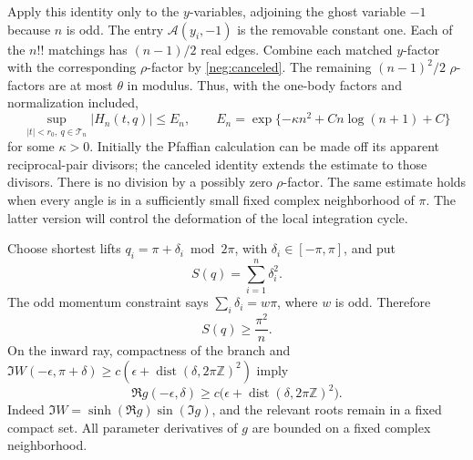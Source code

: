\documentclass[11pt]{article}
\numberwithin{equation}{section}
\theoremstyle{definition}
\newcommand{\Z}{\mathbb Z}
\begin{document}
Apply this identity only to the \(y\)-variables, adjoining the
ghost variable \(-1\) because \(n\) is odd.  The entry
\(\mathcal A(y_i,-1)\) is the removable constant one.
Each of the \(n!!\) matchings has \((n-1)/2\) real edges.
Combine each matched \(y\)-factor with the corresponding
\(\rho\)-factor by \eqref{neg:canceled}.  The remaining
\((n-1)^2/2\) \(\rho\)-factors are at most \(\theta\) in modulus.
Thus, with the one-body factors and normalization included,
\begin{equation}
 \sup_{|t|<r_0,\ q\in\mathcal T_n}|H_n(t,q)|
 \le E_n,\qquad
 E_n=\exp\{-\kappa n^2+C n\log(n+1)+C\}
 \label{neg:gaussian}
\end{equation}
for some \(\kappa>0\).  Initially the Pfaffian calculation can be
made off its apparent reciprocal-pair divisors; the canceled
identity extends the estimate to those divisors.  There is no
division by a possibly zero \(\rho\)-factor.  The same estimate
holds when every angle is in a sufficiently small fixed complex
neighborhood of \(\pi\).  The latter version will control the
deformation of the local integration cycle.

Choose shortest lifts \(q_i=\pi+\delta_i\bmod2\pi\), with
\(\delta_i\in[-\pi,\pi]\), and put
\[
 S(q)=\sum_{i=1}^n\delta_i^2 .
 \]
The odd momentum constraint says
\(\sum_i\delta_i=w\pi\), where \(w\) is odd.  Therefore
\begin{equation}
 S(q)\ge\frac{\pi^2}{n}.
 \label{neg:momentum-gap}
\end{equation}
On the inward ray, compactness of the branch and
\(\Im W(-\epsilon,\pi+\delta)\ge
c(\epsilon+\operatorname{dist}(\delta,2\pi\Z)^2)\) imply
\begin{equation}
 \Re g(-\epsilon,\delta)
 \ge c\bigl(\epsilon+\operatorname{dist}(\delta,2\pi\Z)^2\bigr).
 \label{neg:attenuation}
\end{equation}
Indeed \(\Im W=\sinh(\Re g)\sin(\Im g)\), and the relevant roots
remain in a fixed compact set.  All parameter derivatives of \(g\)
are bounded on a fixed complex neighborhood.
\end{document}
